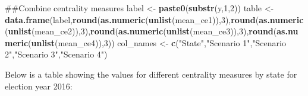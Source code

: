\documentclass[]{article}
\newenvironment{Shaded}{\begin{snugshade}}{\end{snugshade}}
\newcommand{\KeywordTok}[1]{\textcolor[rgb]{0.13,0.29,0.53}{\textbf{#1}}}
\newcommand{\DataTypeTok}[1]{\textcolor[rgb]{0.13,0.29,0.53}{#1}}
\newcommand{\DecValTok}[1]{\textcolor[rgb]{0.00,0.00,0.81}{#1}}
\newcommand{\StringTok}[1]{\textcolor[rgb]{0.31,0.60,0.02}{#1}}
\newcommand{\OtherTok}[1]{\textcolor[rgb]{0.56,0.35,0.01}{#1}}
\newcommand{\OperatorTok}[1]{\textcolor[rgb]{0.81,0.36,0.00}{\textbf{#1}}}
\newcommand{\NormalTok}[1]{#1}
\begin{document}
\begin{Shaded}
\begin{Highlighting}[]
\NormalTok{##Combine centrality measures}
\NormalTok{label <-}\StringTok{ }\KeywordTok{paste0}\NormalTok{(}\KeywordTok{substr}\NormalTok{(y,}\DecValTok{1}\NormalTok{,}\DecValTok{2}\NormalTok{))}
\NormalTok{table <-}\StringTok{ }\KeywordTok{data.frame}\NormalTok{(label,}\KeywordTok{round}\NormalTok{(}\KeywordTok{as.numeric}\NormalTok{(}\KeywordTok{unlist}\NormalTok{(mean_ce1)),}\DecValTok{3}\NormalTok{),}\KeywordTok{round}\NormalTok{(}\KeywordTok{as.numeric}\NormalTok{(}\KeywordTok{unlist}\NormalTok{(mean_ce2)),}\DecValTok{3}\NormalTok{),}\KeywordTok{round}\NormalTok{(}\KeywordTok{as.numeric}\NormalTok{(}\KeywordTok{unlist}\NormalTok{(mean_ce3)),}\DecValTok{3}\NormalTok{),}\KeywordTok{round}\NormalTok{(}\KeywordTok{as.numeric}\NormalTok{(}\KeywordTok{unlist}\NormalTok{(mean_ce4)),}\DecValTok{3}\NormalTok{))}
\NormalTok{col_names <-}\StringTok{ }\KeywordTok{c}\NormalTok{(}\StringTok{"State"}\NormalTok{,}\StringTok{"Scenario 1"}\NormalTok{,}\StringTok{"Scenario 2"}\NormalTok{,}\StringTok{"Scenario 3"}\NormalTok{,}\StringTok{"Scenario 4"}\NormalTok{)}
\end{Highlighting}
\end{Shaded}

Below is a table showing the values for different centrality measures by
state for election year 2016:

\begin{Shaded}
\end{Shaded}
\end{document}
